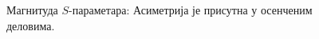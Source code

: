 \begin{figure}[!t]
\centering
{}
\hfill%
\caption{Магнитуда $S$-параметара:  Асиметрија је присутна у осенченим деловима.}
\label{ph:fig2}
\end{figure} 

